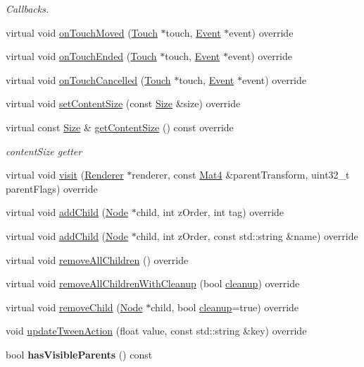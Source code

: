 \begin{DoxyCompactItemize}
\begin{DoxyCompactList}\small\item\em Callbacks. \end{DoxyCompactList}\item 
virtual void \hyperlink{classScrollView_a8a0b3a876f644fbd941773e577c7b550}{on\+Touch\+Moved} (\hyperlink{classTouch}{Touch} $\ast$touch, \hyperlink{classEvent}{Event} $\ast$event) override
\item 
virtual void \hyperlink{classScrollView_aafc1076e1f21bc66749a4c814814d681}{on\+Touch\+Ended} (\hyperlink{classTouch}{Touch} $\ast$touch, \hyperlink{classEvent}{Event} $\ast$event) override
\item 
virtual void \hyperlink{classScrollView_a911e0e123c9f120f654744626bfcfd2c}{on\+Touch\+Cancelled} (\hyperlink{classTouch}{Touch} $\ast$touch, \hyperlink{classEvent}{Event} $\ast$event) override
\item 
virtual void \hyperlink{classScrollView_a9d52bf1ed3831200285167c35fafa686}{set\+Content\+Size} (const \hyperlink{classSize}{Size} \&size) override
\item 
virtual const \hyperlink{classSize}{Size} \& \hyperlink{classScrollView_a996456628c049a6cc2876a7b18d15648}{get\+Content\+Size} () const override
\begin{DoxyCompactList}\small\item\em content\+Size getter \end{DoxyCompactList}\item 
virtual void \hyperlink{classScrollView_a7aee8e0ccdc8235a7ed9e2932ccdcf25}{visit} (\hyperlink{classRenderer}{Renderer} $\ast$renderer, const \hyperlink{classMat4}{Mat4} \&parent\+Transform, uint32\+\_\+t parent\+Flags) override
\item 
virtual void \hyperlink{classScrollView_a251eb14f9abefa4c10ab4d0602b107c1}{add\+Child} (\hyperlink{classNode}{Node} $\ast$child, int z\+Order, int tag) override
\item 
virtual void \hyperlink{classScrollView_af6d19fb104d88a3d884305c2a29842b0}{add\+Child} (\hyperlink{classNode}{Node} $\ast$child, int z\+Order, const std\+::string \&name) override
\item 
virtual void \hyperlink{classScrollView_a6a3b9ea8f88bca7ad741b511de369f24}{remove\+All\+Children} () override
\item 
virtual void \hyperlink{classScrollView_a8b2cfd556bae69ffbd5ae3d5813d53e5}{remove\+All\+Children\+With\+Cleanup} (bool \hyperlink{classNode_aa2de84c6cdeec9cd647d236c30ee0567}{cleanup}) override
\item 
virtual void \hyperlink{classScrollView_a10009c987a878297cabe629369142972}{remove\+Child} (\hyperlink{classNode}{Node} $\ast$child, bool \hyperlink{classNode_aa2de84c6cdeec9cd647d236c30ee0567}{cleanup}=true) override
\item 
void \hyperlink{classScrollView_a0af7498e959826dad2ae4d66f1b5b71d}{update\+Tween\+Action} (float value, const std\+::string \&key) override
\item 
\mbox{\label{classScrollView_a40274c1a8232b918781bdc04fe90c51d}} 
bool {\bfseries has\+Visible\+Parents} () const
\end{DoxyCompactItemize}
